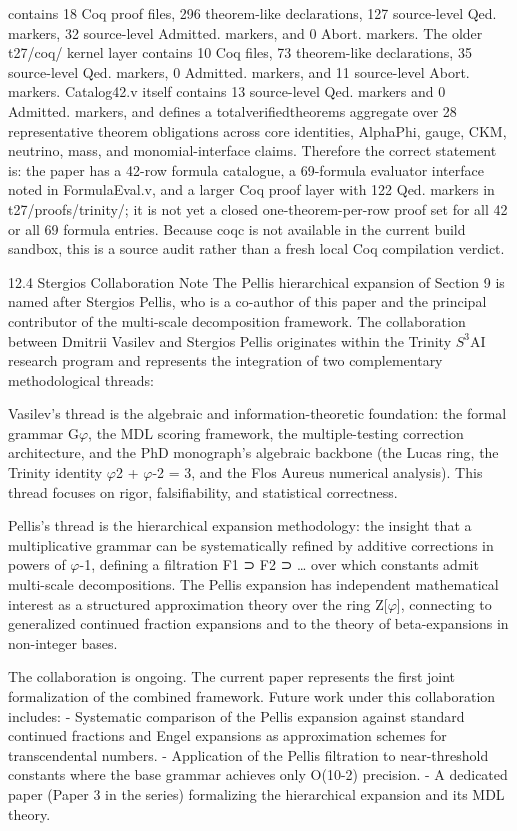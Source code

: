   contains 18 Coq proof files, 296 theorem-like declarations, 127 source-level Qed.
  markers, 32 source-level Admitted. markers, and 0 Abort. markers. The older t27/coq/
  kernel layer contains 10 Coq files, 73 theorem-like declarations, 35 source-level Qed.
  markers, 0 Admitted. markers, and 11 source-level Abort. markers. Catalog42.v itself
  contains 13 source-level Qed. markers and 0 Admitted. markers, and defines a
  totalverifiedtheorems aggregate over 28 representative theorem obligations across
  core identities, AlphaPhi, gauge, CKM, neutrino, mass, and monomial-interface claims.
  Therefore the correct statement is: the paper has a 42-row formula catalogue, a
  69-formula evaluator interface noted in FormulaEval.v, and a larger Coq proof layer
  with 122 Qed. markers in t27/proofs/trinity/; it is not yet a closed one-theorem-per-row
  proof set for all 42 or all 69 formula entries. Because coqc is not available in the current
  build sandbox, this is a source audit rather than a fresh local Coq compilation verdict.

  12.4 Stergios Collaboration Note
  The Pellis hierarchical expansion of Section 9 is named after Stergios Pellis, who is a
  co-author of this paper and the principal contributor of the multi-scale decomposition
  framework. The collaboration between Dmitrii Vasilev and Stergios Pellis originates
  within the Trinity $S^{3}$AI research program and represents the integration of two
  complementary methodological threads:

  Vasilev's thread is the algebraic and information-theoretic foundation: the formal
  grammar G$\varphi$, the MDL scoring framework, the multiple-testing correction architecture,
  and the PhD monograph's algebraic backbone (the Lucas ring, the Trinity identity $\varphi$2 +
  $\varphi$-2 = 3, and the Flos Aureus numerical analysis). This thread focuses on rigor,
  falsifiability, and statistical correctness.

  Pellis's thread is the hierarchical expansion methodology: the insight that a
  multiplicative grammar can be systematically refined by additive corrections in powers
  of $\varphi$-1, defining a filtration F1 ⊃ F2 ⊃ … over which constants admit multi-scale
  decompositions. The Pellis expansion has independent mathematical interest as a
  structured approximation theory over the ring Z[$\varphi$], connecting to generalized
  continued fraction expansions and to the theory of beta-expansions in non-integer
  bases.

  The collaboration is ongoing. The current paper represents the first joint formalization
  of the combined framework. Future work under this collaboration includes:
  - Systematic comparison of the Pellis expansion against standard continued fractions
  and Engel expansions as approximation schemes for transcendental numbers.
  - Application of the Pellis filtration to near-threshold constants where the base grammar
  achieves only O(10-2) precision.
  - A dedicated paper (Paper 3 in the series) formalizing the hierarchical expansion and
  its MDL theory.

